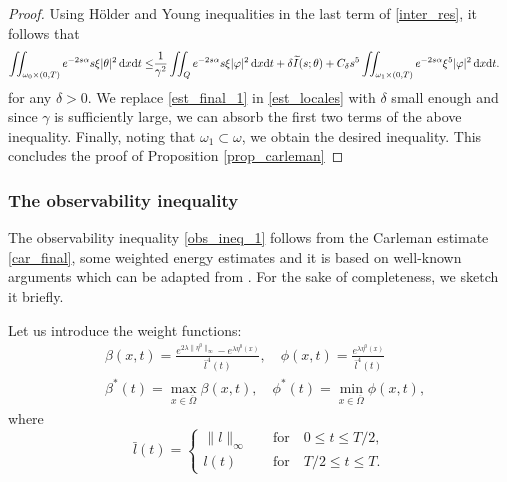 \documentclass[preprint,10pt]{article}
\numberwithin{equation}{section}
\numberwithin{theorem}{section}
\def\dx{\,\textnormal{d}x}
\def\dt{\textnormal{d}t}
\def\dx{\,\textnormal{d}x}
\def\dt{\textnormal{d}t}
\begin{document}
{\begin{proof}
Using H\"older and Young inequalities in the last term of \eqref{inter_res}, it follows that
%
\begin{equation}\label{est_final_1}
\begin{split}
\iint_{\omega_0\times(0,T)}e^{-2s\alpha}s\xi|\theta|^2\dx\dt\leq& \frac{1}{\gamma^2}\iint_{Q}e^{-2s\alpha}s\xi |\varphi|^2\dx\dt+\delta \widetilde I(s;\theta)+C_{\delta}s^5\iint_{\omega_1\times(0,T)}e^{-2s\alpha}\xi^5|\varphi|^2\dx\dt.
\end{split}
\end{equation}
%
for any $\delta>0$. We replace \eqref{est_final_1} in \eqref{est_locales} with $\delta$ small enough and  since $\gamma$ is sufficiently large, we can absorb the first two terms of the above inequality. Finally, noting that $\omega_1\subset \omega$, we obtain the desired inequality. This concludes the proof of Proposition \ref{prop_carleman}
%
\end{proof}

\subsubsection*{The observability inequality}

The observability inequality \eqref{obs_ineq_1} follows from the Carleman estimate \eqref{car_final}, some weighted energy estimates and it is based on well-known arguments which can be adapted from \cite[Lemma 1]{cara_NS}. For the sake of completeness, we sketch it briefly. 

Let us introduce the weight functions:
%
\begin{equation}\label{weights_rec} 
\begin{split}
&\beta(x,t)= \frac{e^{2\lambda\|\eta^0\|_\infty}-e^{\lambda\eta^0(x)}}{\bar l^4(t)}, \quad \phi(x,t)=\frac{e^{\lambda \eta^0(x)}}{\bar l^4(t)} \\
&\beta^*(t)=\max_{x\in\overline{\Omega}}\beta(x,t), \quad \phi^*(t)=\min_{x\in\overline\Omega} \phi(x,t),
\end{split}
\end{equation}
%
where 
\begin{equation*}
\bar l(t)=
\begin{cases}
\|l\|_\infty &\quad\text{for}\quad 0\leq t\leq T/2, \\
l(t) &\quad\text{for}\quad T/2\leq t\leq T. 
\end{cases}
\end{equation*}

}
\end{document}
